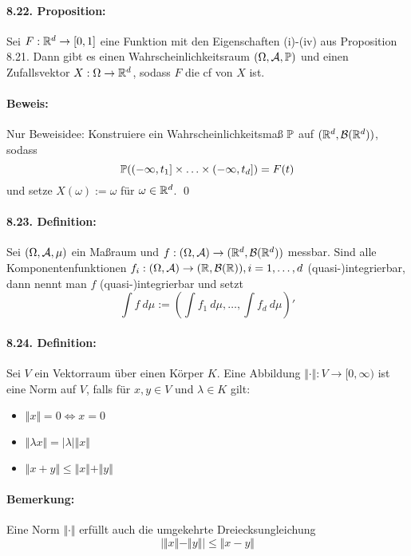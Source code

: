 \documentclass[11pt]{report}
\begin{document}
\paragraph{8.22. Proposition:}Sei $F:\mathbb{R}^d\to[0,1]$ eine Funktion mit den Eigenschaften (i)-(iv) aus Proposition 8.21. Dann gibt es einen Wahrscheinlichkeitsraum $(\Omega, \mathcal{A}, \mathbb{P})$ und einen Zufallsvektor $X:\Omega\to\mathbb{R}^d$, sodass $F$ die cf von $X$ ist.

\paragraph{Beweis:}Nur Beweisidee: Konstruiere ein Wahrscheinlichkeitsma\ss{} $\mathbb{P}$ auf $(\mathbb{R}^d,\mathcal{B}(\mathbb{R}^d))$, sodass 
$$\mathbb{P}((-\infty,t_1]\times\hdots\times(-\infty,t_d])=F(t)$$
und setze $X(\omega):=\omega$ f\"ur $\omega\in\mathbb{R}^d$. \qed

\paragraph{8.23. Definition:}Sei $(\Omega,\mathcal{A},\mu)$ ein Ma\ss{}raum und $f:(\Omega,\mathcal{A})\to(\mathbb{R}^d,\mathcal{B}(\mathbb{R}^d))$ messbar. Sind alle Komponentenfunktionen $f_i:(\Omega,\mathcal{A})\to(\mathbb{R},\mathcal{B}(\mathbb{R})),i=1,\hdots,d$ (quasi-)integrierbar, dann nennt man $f$ (quasi-)integrierbar und setzt
$$\int f\ d\mu:=\left(\int f_1\ d\mu,\hdots,\int f_d\ d\mu\right)'$$


\paragraph{8.24. Definition:}Sei $V$ ein Vektorraum \"uber einen K\"orper $K$. Eine Abbildung $\Vert\cdot\Vert:V\to[0,\infty)$ ist eine Norm auf $V$, falls f\"ur $x,y\in V$ und $\lambda\in K$ gilt:
\begin{itemize}
    \item $\Vert x\Vert=0\iff x=0$
    \item $\Vert\lambda x\Vert=|\lambda|\Vert x\Vert$
    \item $\Vert x+y\Vert\leq\Vert x\Vert+\Vert y\Vert$
\end{itemize}

\paragraph{Bemerkung:}Eine Norm $\Vert\cdot\Vert$ erf\"ullt auch die umgekehrte Dreiecksungleichung
$$\left|\Vert x\Vert-\Vert y\Vert\right|\leq\Vert x-y\Vert$$
\end{document}
